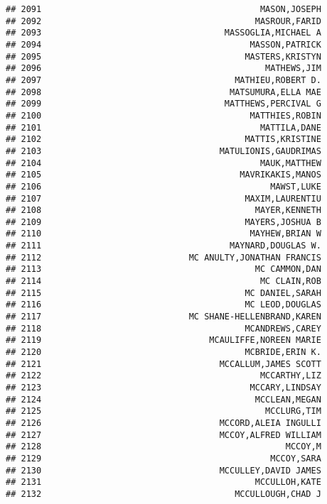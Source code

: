 \documentclass[
]{article}
\begin{document}
\begin{verbatim}
## 2091                                           MASON,JOSEPH
## 2092                                          MASROUR,FARID
## 2093                                    MASSOGLIA,MICHAEL A
## 2094                                         MASSON,PATRICK
## 2095                                        MASTERS,KRISTYN
## 2096                                            MATHEWS,JIM
## 2097                                      MATHIEU,ROBERT D.
## 2098                                     MATSUMURA,ELLA MAE
## 2099                                    MATTHEWS,PERCIVAL G
## 2100                                         MATTHIES,ROBIN
## 2101                                           MATTILA,DANE
## 2102                                        MATTIS,KRISTINE
## 2103                                   MATULIONIS,GAUDRIMAS
## 2104                                           MAUK,MATTHEW
## 2105                                       MAVRIKAKIS,MANOS
## 2106                                             MAWST,LUKE
## 2107                                        MAXIM,LAURENTIU
## 2108                                          MAYER,KENNETH
## 2109                                        MAYERS,JOSHUA B
## 2110                                         MAYHEW,BRIAN W
## 2111                                     MAYNARD,DOUGLAS W.
## 2112                             MC ANULTY,JONATHAN FRANCIS
## 2113                                          MC CAMMON,DAN
## 2114                                           MC CLAIN,ROB
## 2115                                        MC DANIEL,SARAH
## 2116                                        MC LEOD,DOUGLAS
## 2117                             MC SHANE-HELLENBRAND,KAREN
## 2118                                        MCANDREWS,CAREY
## 2119                                 MCAULIFFE,NOREEN MARIE
## 2120                                        MCBRIDE,ERIN K.
## 2121                                   MCCALLUM,JAMES SCOTT
## 2122                                           MCCARTHY,LIZ
## 2123                                         MCCARY,LINDSAY
## 2124                                          MCCLEAN,MEGAN
## 2125                                            MCCLURG,TIM
## 2126                                   MCCORD,ALEIA INGULLI
## 2127                                   MCCOY,ALFRED WILLIAM
## 2128                                                MCCOY,M
## 2129                                             MCCOY,SARA
## 2130                                   MCCULLEY,DAVID JAMES
## 2131                                          MCCULLOH,KATE
## 2132                                      MCCULLOUGH,CHAD J

\end{verbatim}
\end{document}
